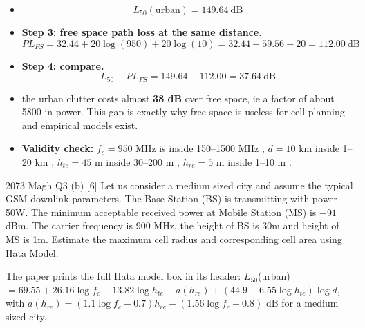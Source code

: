 \begin{itemize}
  \item \[ \boxed{L_{50}(\text{urban}) = 149.64\ \text{dB}} \]
  \item \textbf{Step 3: free space path loss at the same distance.}
        \[ PL_{FS} = 32.44 + 20\log(950) + 20\log(10) = 32.44 + 59.56 + 20 = 112.00\ \text{dB} \]
  \item \textbf{Step 4: compare.}
        \[ L_{50} - PL_{FS} = 149.64 - 112.00 = \boxed{37.64\ \text{dB}} \]
  \item {} the urban clutter costs almost \textbf{38 dB} over free space, ie a
        factor of about 5800 in power. This gap is exactly why free space is useless for cell
        planning and empirical models exist.
  \item \textbf{Validity check:} $f_c = 950$ MHz is inside 150--1500 MHz \checkmark,
        $d = 10$ km inside 1--20 km \checkmark, $h_{te} = 45$ m inside 30--200 m \checkmark,
        $h_{re} = 5$ m inside 1--10 m \checkmark. 
\end{itemize}

\hr

{\color{sub}\footnotesize {} }

\begin{asked}{2073 Magh \textperiodcentered{} Q3 (b) \textperiodcentered{} [6]}
Let us consider a medium sized city and assume the typical GSM downlink parameters. The Base
Station (BS) is transmitting with power 50W. The minimum acceptable received power at Mobile
Station (MS) is $-91$ dBm. The carrier frequency is 900 MHz, the height of BS is 30m and height
of MS is 1m. Estimate the maximum cell radius and corresponding cell area using Hata Model.
\par\vspace{1pt}
{\color{sub}The paper prints the full Hata model box in its header: $L_{50}$(urban)
$= 69.55 + 26.16\log f_c - 13.82\log h_{te} - a(h_{re}) + (44.9 - 6.55\log h_{te})\log d$, with
$a(h_{re}) = (1.1\log f_c - 0.7)h_{re} - (1.56\log f_c - 0.8)$ dB for a medium sized city.}
\end{asked}

